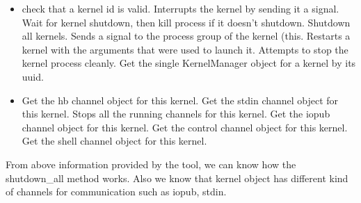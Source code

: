 \begin{itemize}
    \item check that a kernel id is valid. Interrupts the kernel by sending it a signal. Wait for kernel shutdown, then kill process if it doesn't shutdown. Shutdown all kernels. Sends a signal to the process group of the kernel (this. Restarts a kernel with the arguments that were used to launch it. Attempts to stop the kernel process cleanly. Get the single KernelManager object for a kernel by its uuid.
    \item Get the hb channel object for this kernel. Get the stdin channel object for this kernel. Stops all the running channels for this kernel. Get the iopub channel object for this kernel. Get the control channel object for this kernel. Get the shell channel object for this kernel.
    
\end{itemize}

From above information provided by the tool, we can know how the shutdown\_all method works. Also we know that kernel object has different kind of channels for communication such as iopub, stdin.  
